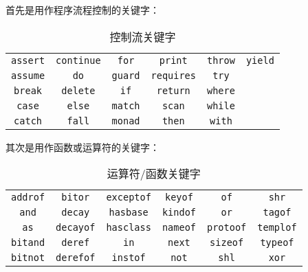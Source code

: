 首先是用作程序流程控制的关键字：

\begin{table}[H]
    \centering
    \begin{tabular}{|c|c|c|c|c|c|} \hline
        \lstinline!assert!  & \lstinline!continue!& \lstinline!for!		& \lstinline!print!		& \lstinline!throw!	& \lstinline!yield! \\
        \lstinline!assume!  & \lstinline!do!      & \lstinline!guard!   & \lstinline!requires!  & \lstinline!try! 	& \lstinline!!  \\
        \lstinline!break!   & \lstinline!delete!  & \lstinline!if!   	& \lstinline!return!  	& \lstinline!where! & \lstinline!! \\
        \lstinline!case!    & \lstinline!else!    & \lstinline!match!   & \lstinline!scan! 		& \lstinline!while! & \lstinline!! \\
        \lstinline!catch!   & \lstinline!fall!    & \lstinline!monad!	& \lstinline!then!   	& \lstinline!with! 	& \lstinline!! \\\hline
    \end{tabular}
    \caption{控制流关键字}
    \label{tab:control-keywords}
\end{table}

其次是用作函数或运算符的关键字：

\begin{table}[H]
    \centering
    \begin{tabular}{|c|c|c|c|c|c|} \hline
        \lstinline!addrof!  & \lstinline!bitor!     & \lstinline!exceptof!	& \lstinline!keyof! & \lstinline!of! 		& \lstinline!shr!     \\
        \lstinline!and!     & \lstinline!decay!     & \lstinline!hasbase!  	& \lstinline!kindof!& \lstinline!or! 		& \lstinline!tagof!      \\
        \lstinline!as!      & \lstinline!decayof!   & \lstinline!hasclass!  & \lstinline!nameof!& \lstinline!protoof! 	& \lstinline!templof!  \\
        \lstinline!bitand!  & \lstinline!deref!     & \lstinline!in!    	& \lstinline!next!  & \lstinline!sizeof! 	& \lstinline!typeof! \\
        \lstinline!bitnot!  & \lstinline!derefof!   & \lstinline!instof!    & \lstinline!not!   & \lstinline!shl! 		& \lstinline!xor! \\\hline
    \end{tabular}
    \caption{运算符/函数关键字}
    \label{tab:operator-keywords}
\end{table}

